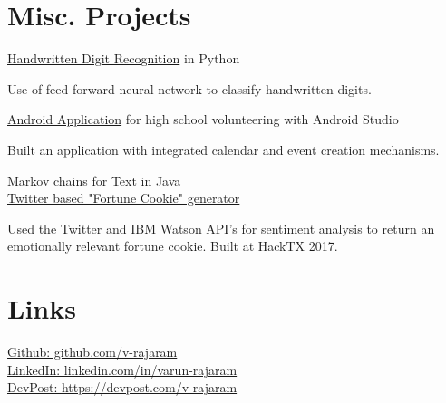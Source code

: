 \documentclass[]{deedy-resume-openfont}
\begin{document}
\begin{minipage}[t]{0.33\textwidth}

\section{Misc. Projects}
\underline{Handwritten Digit Recognition} in Python \\
\vspace{3 mm}
\begin{tightemize}
\item Use of feed-forward neural network to classify handwritten digits. 
\end{tightemize}
\vspace{1 mm}
\underline{Android Application} for high school volunteering with Android Studio
\begin{tightemize}
\item Built an application with integrated calendar and event creation mechanisms. 
\end{tightemize}
\vspace{1 mm}
\underline{Markov chains} for Text in Java \\
\vspace{1 mm}
\underline{Twitter based "Fortune Cookie" generator} \\
\begin{tightemize}
\item Used the Twitter and IBM Watson API's for sentiment analysis to return an emotionally relevant fortune cookie. Built at HackTX 2017.
\end{tightemize}
\vspace{1 mm}




\vspace{2 mm}
\section{Links} 
\href{github.com/v-rajaram}{Github: github.com/v-rajaram} \\
\vspace{1 mm}
\href{linkedin.com/in/varun-rajaram}{LinkedIn: linkedin.com/in/varun-rajaram} \\
\vspace{1 mm}
\href{https://devpost.com/v-rajaram}{DevPost: https://devpost.com/v-rajaram} \\


\end{minipage}
\end{document}
